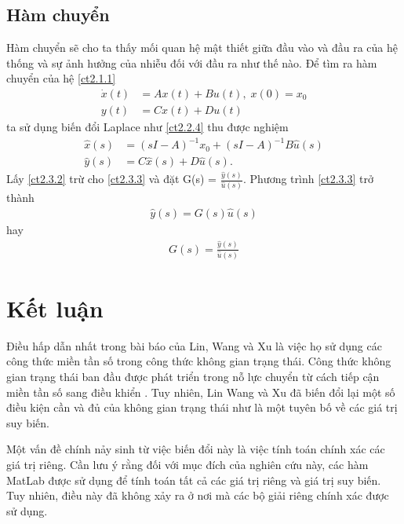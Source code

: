 \documentclass[12pt,a4paper]{article}
\theoremstyle{definition}
\newcommand{\hinf}{\text{\emph{H$_\infty$ }}}
\begin{document}
\subsection{Hàm chuyển}
Hàm chuyển sẽ cho ta thấy mối quan hệ mật thiết giữa đầu vào và đầu ra của hệ thống và sự ảnh hưởng của nhiễu đối với đầu ra như thế nào.
Để tìm ra hàm chuyển của hệ \eqref{ct2.1.1}
\begin{align}
    \dot{x}(t) &= Ax(t) + Bu(t), \; x(0) = x_0 \label{ct2.3.1} \\ 
    y(t) &= Cx(t) + Du(t) \nonumber
\end{align}
ta sử dụng biến đổi Laplace như \eqref{ct2.2.4} thu được nghiệm
\begin{align}
    \hat{x}(s) &= (sI - A)^{-1} x_0 + (sI - A)^{-1} B \hat{u}(s) \label{ct2.3.2}\\
    \hat{y}(s) &= C\hat{x}(s) + D\hat{u}(s). \label{ct2.3.3}
\end{align}
Lấy \eqref{ct2.3.2} trừ cho \eqref{ct2.3.3} và đặt G(s) = $\frac{\hat{y}(s)}{\hat{u}(s)}$. Phương trình \eqref{ct2.3.3} trở thành 
\begin{align}
    \hat{y}(s) = G(s)\hat{u}(s) \nonumber
\end{align}
hay 
\begin{align}
    G(s) = \frac{\hat{y}(s)}{\hat{u}(s)}
\end{align}













\newpage
\section{Kết luận}
Điều hấp dẫn nhất trong bài báo của Lin, Wang và Xu là việc họ sử dụng các công thức miền tần số trong công thức không gian trạng thái. Công thức không gian trạng thái ban đầu được phát triển trong nỗ lực chuyển từ cách tiếp cận miền tần số sang điều khiển \hinf. Tuy nhiên, Lin Wang và Xu đã biến đổi lại một số điều kiện cần và đủ của không gian trạng thái như là một tuyên bố về các giá trị suy biến.

\medskip
Một vấn đề chính nảy sinh từ việc biến đổi này là việc tính toán chính xác các giá trị riêng. Cần lưu ý rằng đối với mục đích của nghiên cứu này, các hàm MatLab được sử dụng để tính toán tất cả các giá trị riêng và giá trị suy biến. Tuy nhiên, điều này đã không xảy ra ở \cite{16} nơi mà các bộ giải riêng chính xác được sử dụng.
\end{document}
